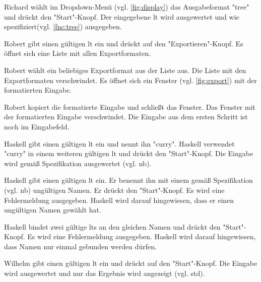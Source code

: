 \documentclass[parskip=full,11pt,twoside]{scrartcl}
\begin{document}
{Richard wählt im Dropdown-Menü (vgl. \cref{fig:display}) das Ausgabeformat "tree" und drückt den "Start"-Knopf.}
{Der eingegebene \gls{lt} wird ausgewertet und wie spezifiziert(vgl. \ref{fnc:tree}) ausgegeben.}


{Robert gibt einen gültigen \gls{lt} ein und drückt auf den "Exportieren"-Knopf.}
{Es öffnet sich eine Liste mit allen Exportformaten.}

{Robert wählt ein beliebiges Exportformat aus der Liste aus.}
{Die Liste mit den Exportformaten verschwindet.
Es öffnet sich ein Fenster (vgl. \cref{fig:export}) mit der formatierten Eingabe.}

{Robert kopiert die formatierte Eingabe und schließt das Fenster.}
{Das Fenster mit der formatierten Eingabe verschwindet. 
 Die Eingabe aus dem ersten Schritt ist noch im Eingabefeld.}
 

{Haskell gibt einen gültigen \gls{lt} ein und nennt ihn "curry".
 Haskell verwendet "curry" in einem weiteren gültigen \gls{lt} und drückt den "Start"-Knopf.}
{Die Eingabe wird gemäß Spezifikation ausgewertet (vgl. \gls{nb}).}

{Haskell gibt einen gültigen \gls{lt} ein.
 Er benennt ihn mit einem gemäß Spezifikation (vgl. \gls{nb}) ungültigen Namen.
 Er drückt den "Start"-Knopf.}
{Es wird eine Fehlermeldung ausgegeben.
 Haskell wird darauf hingewiesen, dass er einen ungültigen Namen gewählt hat.}

{Haskell bindet zwei gültige \glspl{lt} an den gleichen Namen und drückt den "Start"-Knopf.}
{Es wird eine Fehlermeldung ausgegeben. Haskell wird darauf hingewiesen, dass Namen
nur einmal gebunden werden dürfen.}


{Wilhelm gibt einen gültigen \gls{lt} ein und drückt auf den "Start"-Knopf. }
{Die Eingabe wird ausgewertet und nur das Ergebnis wird angezeigt (vgl. \gls{std}).}
\end{document}
